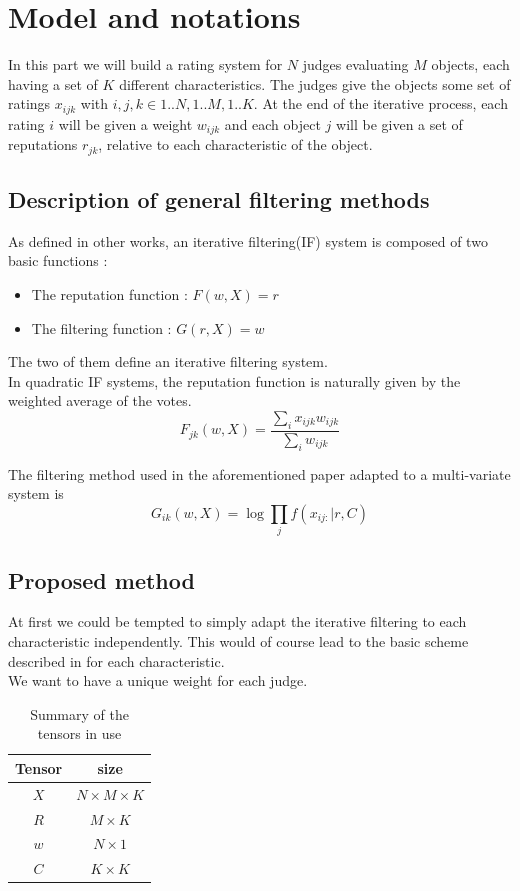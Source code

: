 \documentclass[12pt,a4paper]{article}
\begin{document}
\newpage
\section{Model and notations}
In this part we will build a rating system for $N$ judges evaluating $M$ objects, each having a set of $K$ different characteristics. 
The judges give the objects some set of ratings $x_{ijk}$ with $i,j,k \in {1..N},{1..M},{1..K}$.
At the end of the iterative process, each rating $i$ will be given a weight $w_{ijk}$ and each object $j$ will be given a set of reputations $r_{jk}$, relative to each characteristic of the object.


\subsection{Description of general filtering methods}
As defined in other works, an iterative filtering(IF) system is composed of two basic functions \cite{Cristo1} : 
\begin{itemize}
\item The reputation function : $F(w,X)=r$
\item The filtering function : $G(r,X)=w$
\end{itemize}
The two of them define an iterative filtering system.\\
In quadratic IF systems, the reputation function is naturally given by the weighted average of the votes.
$$F_{jk}(w,X) = \frac{\sum_{i}x_{ijk}w_{ijk}}{\sum_i w_{ijk}}$$

The filtering method used in the aforementioned paper adapted to a multi-variate system is 
$$G_{ik}(w,X) = \log \prod_j f(x_{ij:}|r,C)$$


\subsection{Proposed method}
At first we could be tempted to simply adapt the iterative filtering to each characteristic independently. This would of course lead to the basic scheme described in \cite{Cristo1} for each characteristic.\\
We want to have a unique weight for each judge. 

\begin{table}
\centering
\begin{tabular}{|c|c|}
\hline 
Tensor & size\\
\hline
$X$ & $N\times M \times K$\\
\hline
$R$ & $M\times K$\\
\hline
$w$ & $N\times 1$\\
\hline
$C$ & $K\times K$\\
\hline
\end{tabular}
\caption{Summary of the tensors in use}
\end{table}
\end{document}
